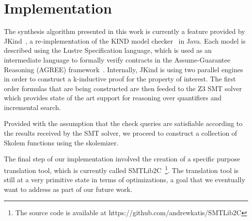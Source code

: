 \section{Implementation}
\label{sec:impl}


The synthesis algorithm presented in this work is currently a feature provided
by JKind~\cite{jkind}, a re-implementation of the KIND model
checker~\cite{Hagen08:kind} in Java. Each model is described using the Lustre
Specification language, which is used as an intermediate language to formally verify contracts in the
Assume-Guarantee Reasoning (AGREE) framework~\cite{NFM2012:CoGaMiWhLaLu}.
Internally, JKind is using two parallel engines in order to construct a
k-inductive proof for the property of interest. The first order formulas that
are being constructed are then feeded to the Z3 SMT
solver~\cite{DeMoura08:z3} which provides state of the art support for reasoning
over quantifiers and incremental search.

Provided with the assumption that the check queries are satisfiable according to
the results received by the SMT solver, we proceed to construct a collection of
Skolem functions using the \aeval skolemizer. 

The final step of our implementation involved the creation of a specific purpose
translation tool, which is currently called SMTLib2C~\footnote{The source code
is available at https://github.com/andrewkatis/SMTLib2C}. The translation tool
is still at a very primitive state in terms of optimizations, a goal that we
eventually want to address as part of our future work.

